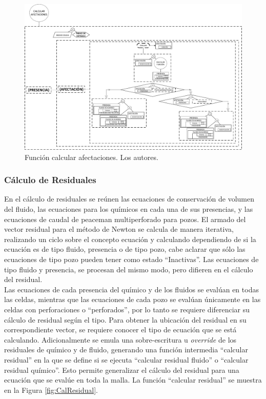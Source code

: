 \begin{figure}[h]
	\centering%
	\includegraphics[width=\linewidth]{Fig/CalcularAfectaciones.pdf}%
	\caption[Función calcular afectaciones.]{Función calcular afectaciones. Los autores.} \label{fig:CalcularAfectaciones}
\end{figure}

\subsubsection{Cálculo de Residuales}\label{subsec:Residual}
En el cálculo de residuales se reúnen las ecuaciones de conservación de volumen del fluido, las ecuaciones para los químicos en cada una de sus presencias, y las ecuaciones de caudal de peaceman multiperforado para pozos. El armado del vector residual para el método de Newton se calcula de manera iterativa, realizando un ciclo sobre el concepto ecuación y calculando dependiendo de si la ecuación es de tipo fluido, presencia o de tipo pozo, cabe aclarar que sólo las ecuaciones de tipo pozo pueden tener como estado ``Inactivas''. Las ecuaciones de tipo fluido y presencia, se procesan del mismo modo, pero difieren en el cálculo del residual.\\

Las ecuaciones de cada presencia del químico y de los fluidos se evalúan en todas las celdas, mientras que las ecuaciones de cada pozo se evalúan únicamente en las celdas con perforaciones o ``perforados'', por lo tanto se requiere diferenciar su cálculo de residual según el tipo. Para obtener la ubicación del residual en su correspondiente vector, se requiere conocer el tipo de ecuación que se está calculando. Adicionalmente se emula una sobre-escritura u \textit{override} de los residuales de químico y de fluido, generando una función intermedia ``calcular residual'' en la que se define si se ejecuta ``calcular residual fluido'' o ``calcular residual químico''. Esto permite generalizar el cálculo del residual para una ecuación que se evalúe en toda la malla. La función ``calcular residual'' se muestra en la Figura \ref{fig:CalResidual}.\\

